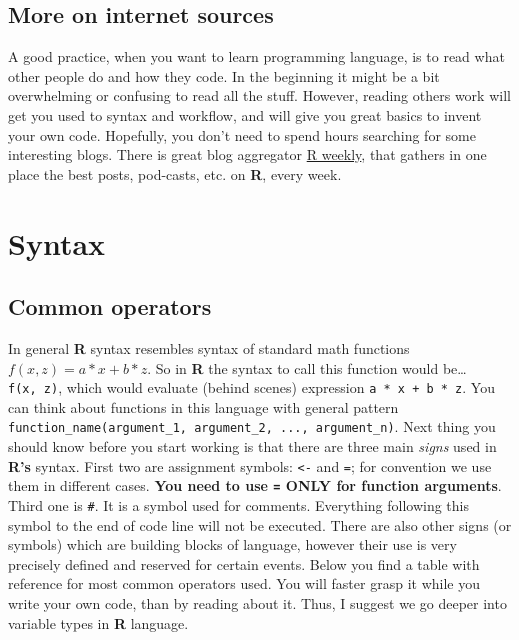 \documentclass[]{book}
\theoremstyle{definition}
\theoremstyle{definition}
\theoremstyle{definition}
\theoremstyle{remark}
\begin{document}
\subsection{More on internet sources}\label{more-on-internet-sources}

A good practice, when you want to learn programming language, is to read
what other people do and how they code. In the beginning it might be a
bit overwhelming or confusing to read all the stuff. However, reading
others work will get you used to syntax and workflow, and will give you
great basics to invent your own code. Hopefully, you don't need to spend
hours searching for some interesting blogs. There is great blog
aggregator \href{https://rweekly.org}{R weekly}, that gathers in one
place the best posts, pod-casts, etc. on \textbf{R}, every week.

\section{Syntax}\label{syntax}

\subsection{Common operators}\label{common-operators}

In general \textbf{R} syntax resembles syntax of standard math functions
\(f(x, z) = a * x + b * z\). So in \textbf{R} the syntax to call this
function would be\ldots{} \texttt{f(x,\ z)}, which would evaluate
(behind scenes) expression \texttt{a\ *\ x\ +\ b\ *\ z}. You can think
about functions in this language with general pattern
\texttt{function\_name(argument\_1,\ argument\_2,\ ...,\ argument\_n)}.
Next thing you should know before you start working is that there are
three main \emph{signs} used in \textbf{R's} syntax. First two are
assignment symbols: \texttt{\textless{}-} and \texttt{=}; for convention
we use them in different cases. \textbf{You need to use \texttt{=} ONLY
for function arguments}. Third one is \texttt{\#}. It is a symbol used
for comments. Everything following this symbol to the end of code line
will not be executed. There are also other signs (or symbols) which are
building blocks of language, however their use is very precisely defined
and reserved for certain events. Below you find a table with reference
for most common operators used. You will faster grasp it while you write
your own code, than by reading about it. Thus, I suggest we go deeper
into variable types in \textbf{R} language.
\end{document}
